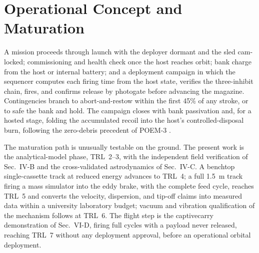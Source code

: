 \documentclass[conference]{IEEEtran}
\begin{document}
\section{Operational Concept and Maturation}\label{sec:conops}
A mission proceeds through launch with the deployer dormant and the sled cam-locked; commissioning and health check once the host reaches orbit; bank charge from the host or internal battery; and a deployment campaign in which the sequencer computes each firing time from the host state, verifies the three-inhibit chain, fires, and confirms release by photogate before advancing the magazine. Contingencies branch to abort-and-restow within the first 45\% of any stroke, or to safe the bank and hold. The campaign closes with bank passivation and, for a hosted stage, folding the accumulated recoil into the host's controlled-disposal burn, following the zero-debris precedent of POEM-3 \cite{poem3}.

The maturation path is unusually testable on the ground. The present work is the analytical-model phase, TRL~2--3, with the independent field verification of Sec.~IV-B and the cross-validated astrodynamics of Sec.~IV-C. A benchtop single-cassette track at reduced energy advances to TRL~4; a full 1.5~m track firing a mass simulator into the eddy brake, with the complete feed cycle, reaches TRL~5 and converts the velocity, dispersion, and tip-off claims into measured data within a university laboratory budget; vacuum and vibration qualification of the mechanism follows at TRL~6. The flight step is the captive\-carry demonstration of Sec.~VI-D, firing full cycles with a payload never released, reaching TRL~7 without any deployment approval, before an operational orbital deployment.
\end{document}
